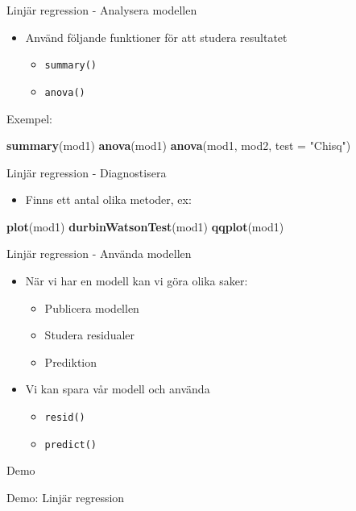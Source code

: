 \documentclass[
  11pt,
  ignorenonframetext,
  handout]{beamer}
\newenvironment{Shaded}{\begin{snugshade}}{\end{snugshade}}
\newcommand{\AttributeTok}[1]{\textcolor[rgb]{0.13,0.29,0.53}{#1}}
\newcommand{\FunctionTok}[1]{\textcolor[rgb]{0.13,0.29,0.53}{\textbf{#1}}}
\newcommand{\NormalTok}[1]{#1}
\newcommand{\StringTok}[1]{\textcolor[rgb]{0.31,0.60,0.02}{#1}}
\providecommand{\tightlist}{%
  \setlength{\itemsep}{0pt}\setlength{\parskip}{0pt}}
\begin{document}
\begin{frame}[fragile]{Linjär regression - Analysera modellen}
\label{linjuxe4r-regression---analysera-modellen}
\begin{itemize}
\tightlist
\item
  Använd följande funktioner för att studera resultatet

  \begin{itemize}
  \tightlist
  \item
    \texttt{summary()}
  \item
    \texttt{anova()}
  \end{itemize}
\end{itemize}

Exempel:

\begin{Shaded}
\begin{Highlighting}[]
\FunctionTok{summary}\NormalTok{(mod1)}
\FunctionTok{anova}\NormalTok{(mod1)}
\FunctionTok{anova}\NormalTok{(mod1, mod2, }\AttributeTok{test =} \StringTok{"Chisq"}\NormalTok{)}
\end{Highlighting}
\end{Shaded}
\end{frame}

\begin{frame}[fragile]{Linjär regression - Diagnostisera}
\label{linjuxe4r-regression---diagnostisera}
\begin{itemize}
\tightlist
\item
  Finns ett antal olika metoder, ex:
\end{itemize}

\begin{Shaded}
\begin{Highlighting}[]
\FunctionTok{plot}\NormalTok{(mod1)}
\FunctionTok{durbinWatsonTest}\NormalTok{(mod1)}
\FunctionTok{qqplot}\NormalTok{(mod1)}
\end{Highlighting}
\end{Shaded}
\end{frame}

\begin{frame}{Linjär regression - Använda modellen}
\label{linjuxe4r-regression---anvuxe4nda-modellen}
\begin{itemize}
\tightlist
\item
  När vi har en modell kan vi göra olika saker:

  \begin{itemize}
  \tightlist
  \item
    Publicera modellen
  \item
    Studera residualer
  \item
    Prediktion
  \end{itemize}
\item
  Vi kan spara vår modell och använda

  \begin{itemize}
  \tightlist
  \item
    \texttt{resid()}
  \item
    \texttt{predict()}
  \end{itemize}
\end{itemize}
\end{frame}

\begin{frame}{Demo}
\label{demo-2}
\begin{block}{Demo: Linjär regression}
\label{demo-linjuxe4r-regression}
\end{block}
\end{frame}
\end{document}
